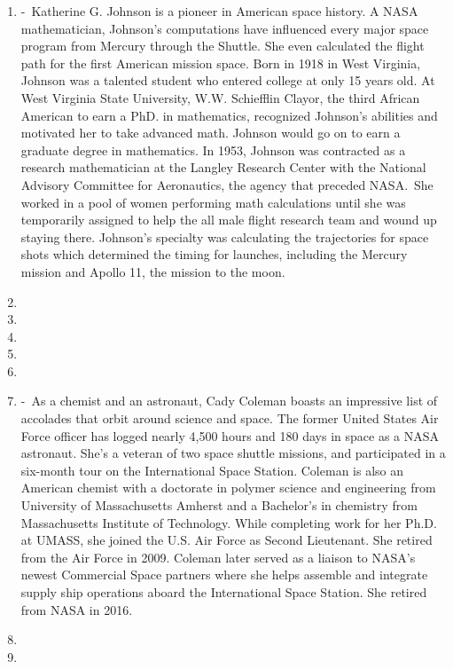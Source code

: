 \documentclass[12pt,a4paper]{article}
\begin{document}
\begin{enumerate}
  \item {} -\ Katherine G. Johnson is a pioneer in American space history. A NASA mathematician, Johnson's computations have influenced every major space program from Mercury through the Shuttle. She even calculated the flight path for the first American mission space. Born in 1918 in West Virginia, Johnson was a talented student who entered college at only 15 years old. At West Virginia State University, W.W. Schiefflin Clayor, the third African American to earn a PhD. in mathematics, recognized Johnson's abilities and motivated her to take advanced math. Johnson would go on to earn a graduate degree in mathematics. In 1953, Johnson was contracted as a research mathematician at the Langley Research Center with the National Advisory Committee for Aeronautics, the agency that preceded NASA.\ She worked in a pool of women performing math calculations until she was temporarily assigned to help the all male flight research team and wound up staying there. Johnson's specialty was calculating the trajectories for space shots which determined the timing for launches, including the Mercury mission and Apollo 11, the mission to the moon.
  \item {}
  \item {}
  \item {}
  \item {}
  \item {}
  \item {} -\ As a chemist and an astronaut, Cady Coleman boasts an impressive list of accolades that orbit around science and space. The former United States Air Force officer has logged nearly 4,500 hours and 180 days in space as a NASA astronaut. She's a veteran of two space shuttle missions, and participated in a six-month tour on the International Space Station. Coleman is also an American chemist with a doctorate in polymer science and engineering from University of Massachusetts Amherst and a Bachelor's in chemistry from Massachusetts Institute of Technology. While completing work for her Ph.D. at UMASS, she joined the U.S. Air Force as Second Lieutenant. She retired from the Air Force in 2009. Coleman later served as a liaison to NASA's newest Commercial Space partners where she helps assemble and integrate supply ship operations aboard the International Space Station. She retired from NASA in 2016.
  \item {}
  \item {}
\end{enumerate}
\end{document}
